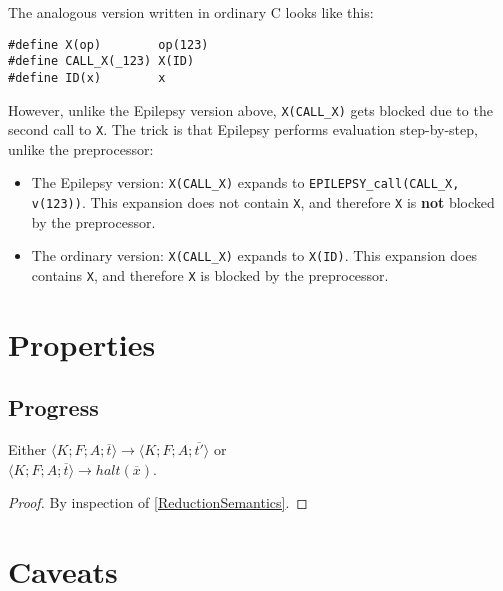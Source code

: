 \documentclass[12pt]{article}
\theoremstyle{break}
\begin{document}
The analogous version written in ordinary C looks like this:

\begin{verbatim}
#define X(op)        op(123)
#define CALL_X(_123) X(ID)
#define ID(x)        x
\end{verbatim}

However, unlike the Epilepsy version above, \texttt{X(CALL\_X)} gets blocked \cite{Blueprinting} due to the
second call to \texttt{X}. The trick is that Epilepsy performs evaluation step-by-step,
unlike the preprocessor:

\begin{itemize}
    \item The Epilepsy version: \texttt{X(CALL\_X)} expands to \texttt{EPILEPSY\_call(CALL\_X, v(123))}.
    This expansion does not contain \texttt{X}, and therefore \texttt{X} is \textbf{not}
    blocked by the preprocessor.

    \item The ordinary version: \texttt{X(CALL\_X)} expands to \texttt{X(ID)}. This expansion
    does contains \texttt{X}, and therefore \texttt{X} is blocked by the preprocessor.
\end{itemize}

\section{Properties}

\subsection{Progress}

\begin{proposition}[Progress]
Either $\langle K; F; A; \overline{t} \rangle \to \langle K; F; A; \overline{t'} \rangle$ or \\
$\langle K; F; A; \overline{t} \rangle \to halt(\overline{x})$.
\end{proposition}

\begin{proof}
By inspection of \ref{ReductionSemantics}.
\end{proof}

\section{Caveats}
\end{document}
